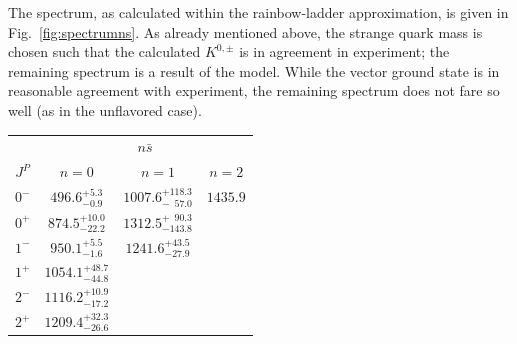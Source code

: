 The spectrum, as calculated within the rainbow-ladder approximation, is given in Fig.~\ref{fig:spectrumns}. 
As already mentioned above, the strange quark mass is chosen such that the calculated $K^{0,\pm}$ 
is in agreement in experiment; the remaining spectrum is a result of the model.
While the vector ground state is in reasonable agreement with experiment, the remaining spectrum 
does not fare so well (as in the unflavored case).
\begin{table}
\centering
\renewcommand{\arraystretch}{1.3}
\begin{tabular}{c|ccc|}
\hline
\hline
          				     & \multicolumn{3}{c|}{$n\bar{s}$}  \\
$J^P   $&  $n=0$    &$n=1$  & $n=2$ \\
\hline                                                                                                                                                                                                     
{$0^-$}       &   { $496.6^{+5.3}_{-0.9}$} &  {$1007.6^{+118.3}_{-\phantom{1}57.0}$ } & {$1435.9$} \\                                                                                                                                                                        
{$0^+$}       &  { $874.5^{+10.0}_{-22.2}$ } &  {$1312.5^{+\phantom{1}90.3}_{-143.8}$} &  \\                                                                                                                                                                        
\hline                                                                                                                                                                                                     
{$1^-$}       &   {$ 950.1^{+5.5}_{-1.6}$} &  {$1241.6^{+43.5}_{-27.9}$ } &  \\                                                                                                                                                                  
{$1^+$}       & {$1054.1^{+48.7}_{-44.8}$} &   &  \\
\hline                                                                                                                                                                                                     
{$2^-$}       &  { $1116.2^{+10.9}_{-17.2}$ } &   &  \\
{$2^+$}       &  {$1209.4^{+32.3}_{-26.6}$} &   &  \\
\hline                                                                                                                                                                                                     

\end{tabular}
\end{table}
